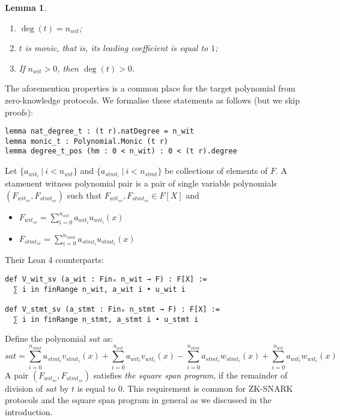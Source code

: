 \documentclass{article}
\newtheorem{lemma}{Lemma}
\theoremstyle{definition}
\theoremstyle{remark}
\begin{document}
\begin{lemma}
$ $

\begin{enumerate}
\item $\deg(t) = n_{wit}$;
\item $t$ is monic, that is, its leading coefficient is equal to $1$;
\item If $n_{wit} > 0$, then $\deg(t) > 0$.
\end{enumerate}
\end{lemma}

The aforemention properties is a common place for the target polynomial from zero-knowledge protocols. 
We formalise these statements as follows (but we skip proofs):
\begin{lstlisting}
lemma nat_degree_t : (t r).natDegree = n_wit
lemma monic_t : Polynomial.Monic (t r)
lemma degree_t_pos (hm : 0 < n_wit) : 0 < (t r).degree
\end{lstlisting}

Let $\{ a_{{wit}_i} \: | \: i < n_{wit}\}$ and $\{ a_{{stmt}_i} \: | \: i < n_{stmt} \}$ be collections of elements of $F$.
A stamenent witness polynomial pair is a pair of single variable polynomials $(F_{{wit}_{sv}}, F_{{stmt}_{sv}})$
such that $F_{{wit}_{sv}}, F_{{stmt}_{sv}} \in F[X]$ and
\begin{itemize}
\item $F_{{wit}_{sv}} = \sum \limits_{i = 0}^{n_{wit}} a_{{wit}_i} u_{{wit}_{i}}(x)$
\item $F_{{stmt}_{sv}} = \sum \limits_{i = 0}^{n_{stmt}} a_{{stmt}_i} u_{{stmt}_{i}}(x)$
\end{itemize}

Their Lean 4 counterparts:
\begin{lstlisting}
def V_wit_sv (a_wit : Finₓ n_wit → F) : F[X] :=
  ∑ i in finRange n_wit, a_wit i • u_wit i

def V_stmt_sv (a_stmt : Finₓ n_stmt → F) : F[X] :=
  ∑ i in finRange n_stmt, a_stmt i • u_stmt i
\end{lstlisting}

Define the polynomial $sat$ as:
\begin{equation}
sat = \sum \limits_{i = 0}^{n_{stmt}} a_{{stmt}_i} v_{{stmt}_i}(x) + \sum \limits_{i = 0}^{n_{wit}} a_{{wit}_i} v_{{wit}_i}(x) - \sum \limits_{i = 0}^{n_{stmt}} a_{{stmt}_i} w_{{stmt}_i}(x) + \sum \limits_{i = 0}^{n_{wit}} a_{{wit}_i} w_{{wit}_i}(x)
\end{equation}
A pair $(F_{{wit}_{sv}}, F_{{stmt}_{sv}})$ satisfies \emph{the square span program},
if the remainder of division of $sat$ by $t$ is equal to $0$.
This requirement is common for ZK-SNARK protocols and the square span program in general as we discussed in the introduction.
\end{document}
